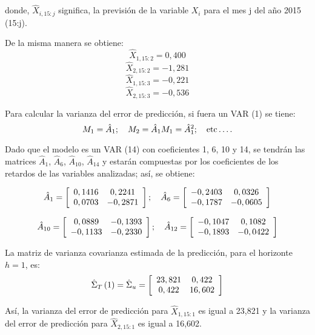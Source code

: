 \begin{enumerate}
donde, $\hat{X}_{i,15:j}$ significa, la previsi\'{o}n de la variable $X_{i}$ para el mes j del a\~{n}o 2015 (15:j).\newline

De la misma manera se obtiene:
\[
\hat{X}_{1,15:2}=0,400
\]
\[
\hat{X}_{2,15:2}=-1,281
\]
\[
\hat{X}_{1,15:3}=-0,221
\]
\[
\hat{X}_{2,15:3}=-0,536
\]

Para calcular la varianza del error de predicci\'{o}n, si fuera un VAR (1) se tiene:
\[
M_{1}=\hat{A}_{1};\quad M_{2}=\hat{A}_{1}M_{1}=\hat{A}_{1}^{2};\quad \mbox{etc}\mathellipsis.
\]

Dado que el modelo es un VAR (14) con coeficientes 1, 6, 10 y 14, se tendr\'{a}n las matrices $\hat{A}_{1}$, $\hat{A}_{6}$, $\hat{A}_{10}$, $\hat{A}_{14}$ y estar\'{a}n compuestas por los coeficientes de los retardos de las variables analizadas; as\'{i}, se obtiene:

\[
\hat{A}_{1}=\left[ {\begin{array}{*{20}c}
0,1416 & 0,2241\\
0,0703 & -0,2871\\
\end{array} } \right];\quad 
\hat{A}_{6}=\left[ {\begin{array}{*{20}c}
-0,2403 & 0,0326\\
-0,1787 & -0,0605\\
\end{array} } \right]
\]

\[
\hat{A}_{10}=\left[ {\begin{array}{*{20}c}
0,0889 & -0,1393\\
-0,1133 & -0,2330\\
\end{array} } \right];\quad 
\hat{A}_{12}=\left[ {\begin{array}{*{20}c}
-0,1047 & 0,1082\\
-0,1893 & -0,0422\\
\end{array} } \right] 
\]

La matriz de varianza covarianza estimada de la predicci\'{o}n, para el horizonte $h=1$, es: 
\[
\hat{\Sigma}_{T}\left( 1 \right)=\hat{\Sigma}_{u}=\left[ 
{\begin{array}{*{20}c}
23,821 & 0,422\\
0,422 & 16,602\\
\end{array} } \right]
\]

As\'{i}, la varianza del error de predicci\'{o}n para $\hat{X}_{1,15:1}$ es igual a 23,821 y la varianza del error de predicci\'{o}n para $\hat{X}_{2,15:1}$ es igual a 16,602.\newline


\end{enumerate}
